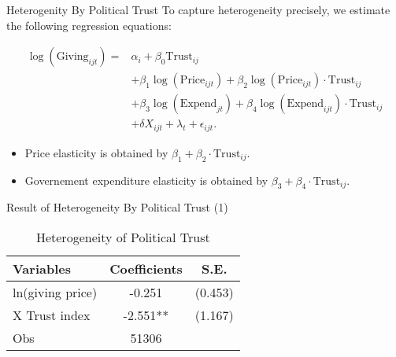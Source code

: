 \documentclass[
  ignorenonframetext,
]{beamer}
\providecommand{\tightlist}{%
  \setlength{\itemsep}{0pt}\setlength{\parskip}{0pt}}
\begin{document}
\begin{frame}{Heterogenity By Political Trust}
\protect\hypertarget{heterogenity-by-political-trust}{}
To capture heterogeneity precisely, we estimate the following regression
equations:

\begin{align*}
    \log(\text{Giving}_{ijt}) = 
    &\alpha_i + \beta_0 \text{Trust}_{ij} \\
    &+ \beta_1 \log(\text{Price}_{ijt}) + \beta_2 \log(\text{Price}_{ijt})\cdot\text{Trust}_{ij} \\
    &+ \beta_3 \log(\text{Expend}_{jt}) + \beta_4 \log(\text{Expend}_{ijt})\cdot\text{Trust}_{ij}\\
    &+ \delta X_{ijt} + \lambda_t + \epsilon_{ijt}.
\end{align*}

\begin{itemize}
\tightlist
\item
  Price elasticity is obtained by
  \(\beta_1 + \beta_2\cdot\text{Trust}_{ij}\).
\item
  Governement expenditure elasticity is obtained by
  \(\beta_3 + \beta_4\cdot\text{Trust}_{ij}\).
\end{itemize}
\end{frame}

\begin{frame}{Result of Heterogeneity By Political Trust (1)}
\protect\hypertarget{result-of-heterogeneity-by-political-trust-1}{}
\begin{table}

\caption{\label{tab:kableTabTrustHeteroReg}Heterogeneity of Political Trust}
\centering
\begin{tabular}[t]{lcc}
\toprule
Variables & Coefficients & S.E.\\
\midrule
ln(giving price) & -0.251 & (0.453)\\
\hspace{1em}X Trust index & -2.551** & (1.167)\\
Obs & 51306 & \\
\bottomrule
\end{tabular}
\end{table}
\end{frame}
\end{document}
